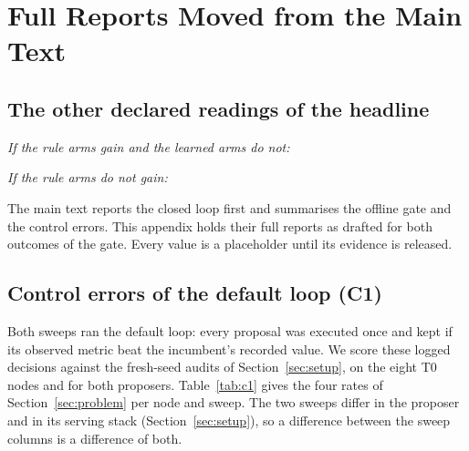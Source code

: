 \section{Full Reports Moved from the Main Text}
\label{app:results-main}

\ifLoopOutcomeSet\else
\subsection{The other declared readings of the headline}
\label{app:readings}

\emph{If the rule arms gain and the learned arms do not:} \ReadingRuleForGate

\emph{If the rule arms do not gain:} \ReadingNegative
\fi

The main text reports the closed loop first and summarises the offline gate and the control errors. This appendix holds their full reports as drafted for both outcomes of the gate. Every value is a placeholder until its evidence is released.

\subsection{Control errors of the default loop (C1)}
\label{app:c1}

Both sweeps ran the default loop: every proposal was executed once and kept if its observed metric beat the incumbent's recorded value. We score these logged decisions against the fresh-seed audits of Section~\ref{sec:setup}, on the eight T0 nodes and for both proposers.  Table~\ref{tab:c1} gives the four rates of Section~\ref{sec:problem} per node and sweep. The two sweeps differ in the proposer and in its serving stack (Section~\ref{sec:setup}), so a difference between the sweep columns is a difference of both.

